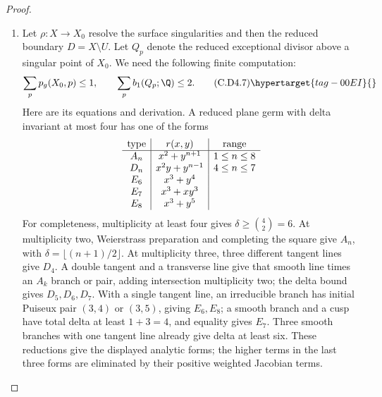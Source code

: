 \begin{proof}
\begin{enumerate}[label={$\langle1\rangle$\arabic*.},leftmargin=*]
\item Let $\rho:X\to X_0$ resolve the surface singularities and
then the reduced boundary $D=X\setminus U$. Let $Q_p$ denote
the reduced exceptional divisor above a singular point of
$X_0$. We need the following finite computation:
\[
  \sum_p p_g(X_0,p)\le1,\qquad
  \sum_p b_1(Q_p;\Q)\le2.
\tag{C.D4.7}\hypertarget{tag-00EI}{}\label{cdp:eq:C.D4.7}
\]
Here are its equations and derivation. A reduced plane germ
with delta invariant at most four has one of the forms
\[
\begin{array}{c|c|c}
 \hbox{type}&r(x,y)&\hbox{range}\\ \hline
 A_n&x^2+y^{n+1}&1\le n\le8\\
 D_n&x^2y+y^{n-1}&4\le n\le7\\
 E_6&x^3+y^4&\\
 E_7&x^3+xy^3&\\
 E_8&x^3+y^5&
\end{array}
\]
For completeness, multiplicity at least four gives
$\delta\ge\binom42=6$. At multiplicity two, Weierstrass
preparation and completing the square give $A_n$, with
$\delta=\lfloor(n+1)/2\rfloor$. At multiplicity three,
three different tangent lines give $D_4$. A double tangent
and a transverse line give that smooth line times an
$A_k$ branch or pair, adding intersection multiplicity two;
the delta bound gives $D_5,D_6,D_7$. With a single tangent
line, an irreducible branch has initial Puiseux pair $(3,4)$
or $(3,5)$, giving $E_6,E_8$; a smooth branch and a cusp
have total delta at least $1+3=4$, and equality gives $E_7$.
Three smooth branches with one tangent line already give
delta at least six. These reductions give the displayed
analytic forms; the higher terms in the last three forms
are eliminated by their positive weighted Jacobian terms.


\end{enumerate}
\end{proof}
